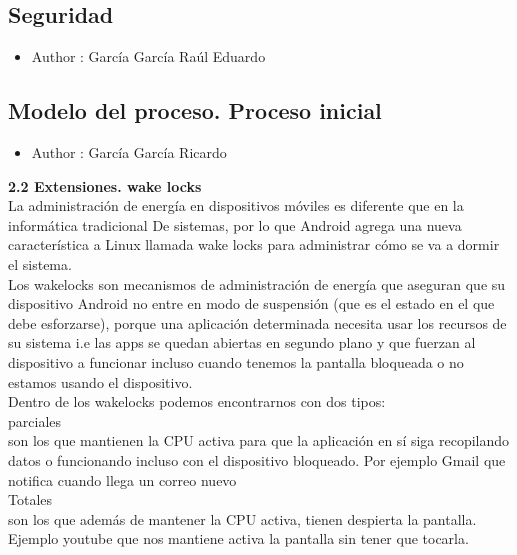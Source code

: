 \documentclass[a4paper]{article}
\begin{document}
\subsection{Seguridad}
\begin{itemize}
\item Author : García García Raúl Eduardo
\end{itemize}

\subsection{Modelo del proceso. Proceso inicial}
\begin{itemize}
\item Author : García García Ricardo
\end{itemize}



\newpage 
\textbf{\Large{2.2 \; Extensiones. wake locks}}\\[0.4em]

La administración de energía en dispositivos móviles es diferente que en la informática tradicional
De sistemas, por lo que Android agrega una nueva característica a Linux llamada wake locks para administrar cómo se va a dormir el sistema.\\
Los wakelocks son mecanismos de administración de energía que aseguran que su dispositivo Android no entre en modo de suspensión (que es el estado en el que debe esforzarse), porque una aplicación determinada necesita usar los recursos de su sistema i.e  las apps  se quedan abiertas en segundo plano y que fuerzan al dispositivo a funcionar incluso cuando tenemos la pantalla bloqueada o no estamos usando el dispositivo. \\
Dentro de los wakelocks podemos encontrarnos con dos tipos:\\

parciales \\                                                                                        son los que mantienen la CPU activa para que la aplicación en sí siga recopilando datos o funcionando incluso con el dispositivo bloqueado.                                                 Por ejemplo Gmail que notifica cuando llega un correo nuevo\\ 

Totales\\
son los que además de mantener la CPU activa, tienen despierta la pantalla.                                                                                                                         Ejemplo youtube que nos mantiene activa la pantalla sin tener que tocarla.\\
\end{document}
